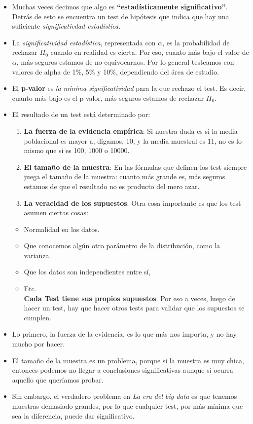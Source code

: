 \documentclass[]{book}
\providecommand{\tightlist}{%
  \setlength{\itemsep}{0pt}\setlength{\parskip}{0pt}}
\begin{document}
\begin{itemize}
\item
  Muchas veces decimos que algo es \textbf{``estadísticamente significativo''}. Detrás de esto se encuentra un test de hipótesis que indica que hay una suficiente \emph{significativdad estadística}.
\item
  La \emph{significatividad estadística}, representada con \(\alpha\), es la probabilidad de rechazar \(H_0\) cuando en realidad es cierta. Por eso, cuanto más bajo el valor de \(\alpha\), más seguros estamos de no equivocarnos. Por lo general testeamos con valores de alpha de 1\%, 5\% y 10\%, dependiendo del área de estudio.
\item
  El \textbf{p-valor} es \emph{la mínima significatividad} para la que rechazo el test. Es decir, cuanto más bajo es el p-valor, más seguros estamos de rechazar \(H_0\).
\item
  El resultado de un test está determinado por:

  \begin{enumerate}
  \def\labelenumi{\arabic{enumi}.}
  \tightlist
  \item
    \textbf{La fuerza de la evidencia empírica}: Si nuestra duda es si la media poblacional es mayor a, digamos, 10, y la media muestral es 11, no es lo mismo que si es 100, 1000 o 10000.
  \item
    \textbf{El tamaño de la muestra}: En las fórmulas que definen los test siempre juega el tamaño de la muestra: cuanto más grande es, más seguros estamos de que el resultado no es producto del mero azar.
  \item
    \textbf{La veracidad de los supuestos}: Otra cosa importante es que los test asumen ciertas cosas:
  \end{enumerate}

  \begin{itemize}
  \tightlist
  \item
    Normalidad en los datos.
  \item
    Que conocemos algún otro parámetro de la distribución, como la varianza.
  \item
    Que los datos son independientes entre sí,
  \item
    Etc.\\
    \textbf{Cada Test tiene sus propios supuestos}. Por eso a veces, luego de hacer un test, hay que hacer otros tests para validar que los supuestos se cumplen.
  \end{itemize}
\item
  Lo primero, la fuerza de la evidencia, es lo que más nos importa, y no hay mucho por hacer.
\item
  El tamaño de la muestra es un problema, porque si la muestra es muy chica, entonces podemos no llegar a conclusiones significativas aunque sí ocurra aquello que queríamos probar.
\item
  Sin embargo, el verdadero problema en \emph{La era del big data} es que tenemos muestras demasiado grandes, por lo que cualquier test, por más mínima que sea la diferencia, puede dar significativo.
\end{itemize}
\end{document}

